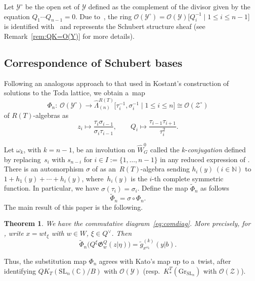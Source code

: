 \documentclass[10pt,a4paper]{amsart}
\numberwithin{equation}{section}
\newcommand{\C}{\mathbb{C}}
\newcommand{\Gr}{\mathrm{Gr}}
\newcommand{\Gro}[1]{\mathfrak{G}^Q_{#1}}
\renewcommand{\O}{\mathscr{O}}
\newcommand{\Rep}{{R(T)}}
\newcommand{\SL}{\mathrm{SL}}
\newtheorem{Theorem}{Theorem}[section]
\theoremstyle{definition}
\begin{document}
Let $\mathscr{Y}^\circ$ be the open set of $\mathscr{Y}$ defined as the complement of the divisor given by the equation $Q_1\cdots Q_{n-1}=0$.
Due to~\cite{MNS2}, the ring $\mathscr{O}(\mathscr{Y}^\circ)=\mathscr{O}(\mathscr{Y})\big[Q_i^{-1}\mid 1\leq i\leq n-1\big]$
is identified with~\smash{$QK_T^{\mathrm{pol}}(\SL_n(\C)/B)_Q$}
and  represents the Schubert structure sheaf  (see Remark~\ref{rem:QK=O(Y)} for more details).

\subsection{Correspondence of Schubert bases}
Following an analogous approach to that used in Kostant's construction of solutions to the Toda lattice, we obtain a~map
\[\Phi_n\colon \ \mathscr{O}(\mathscr{Y}^\circ)
\longrightarrow \hat{\Lambda}^{\Rep}_{(n)}\big[\tau_i^{-1},\sigma_i^{-1}\mid 1\leq i\leq n\big]
\cong\mathscr{O}(\mathscr{Z}^\circ)\]
of $\Rep$-algebras as
\begin{equation}
z_i\mapsto \frac{\tau_i\sigma_{i-1}}{\sigma_i \tau_{i-1}},\qquad
Q_i\mapsto \frac{\tau_{i-1}\tau_{i+1}}{\tau_i^2}.\label{eq:Phi}
\end{equation}

Let $\omega_k$, with $k=n-1$, be an involution on $\hat{W}_G^0$ called the $k$-\emph{conjugation} defined by replacing~$s_i$ with $s_{n-i}$ for $i \in I:=\{1,\dots,n-1\}$ in any reduced expression of .
There is an automorphism $\sigma$ of \smash{$\hat{\Lambda}^{\Rep}_{(n)}$} as an~$\Rep$-algebra
sending $h_i(y)\ (i\in\mathbb{N})$ to $1+h_1(y)+\cdots+h_i(y)$, where~$h_i(y)$ is the
$i$-th complete symmetric function.
In particular, we have $\sigma(\tau_i)=\sigma_i$.
Define the map $\tilde{\Phi}_n$ as follows
\begin{equation}
\label{eq:tPhi}
\tilde{\Phi}_n=\sigma \circ \Phi_n.
\end{equation}
The main result of this paper is the following.
\begin{Theorem}\label{thm:main}
We have the commutative diagram~\eqref{eq:comdiag}. More precisely,
for , write $x=wt_\xi$ with $w\in W$, $\xi\in Q^\vee$. Then
\[
\tilde{\Phi}_n\bigl(
Q^\xi \Gro{w}(z| \eta)\bigr)=
\tilde{g}_{x^{\omega_k}}^{(k)}(y|b).
\]
\end{Theorem}
Thus, the substitution map ${\Phi}_n$ agrees with Kato's map up to a~twist, after identifying
 $QK_T(\SL_n(\C)/B)$ with $\mathscr{O}(\mathscr{Y})$ \big(resp.\ $K_*^T(\Gr_{\SL_n})$ with $\O(\mathscr{Z})$\big).
\end{document}
